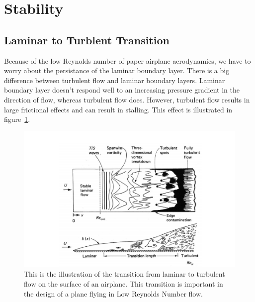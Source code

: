 
\section{Stability}

\subsection{Laminar to Turblent Transition}

Because of the low Reynolds number of paper airplane aerodynamics, we have to worry about
the persistance of the laminar boundary layer.
There is a big difference between turbulent flow and laminar boundary
layers. Laminar boundary layer doesn't respond well to an increasing
pressure gradient in the direction of flow, whereas turbulent flow does.
However, turbulent flow results in large frictional effects and can result in stalling.
This effect is illustrated in figure~\ref{fig:boundary_layer_transition}.

\begin{figure}[hl]
  \centering
    \includegraphics[scale=.7]{figures/boundary_layer_transition.png}
    \caption{This is the illustration of the transition from laminar to turbulent flow on the
    surface of an airplane. This transition is important in the design of a plane flying in
    Low Reynolds Number flow.}
  \label{fig:boundary_layer_transition}
\end{figure}

